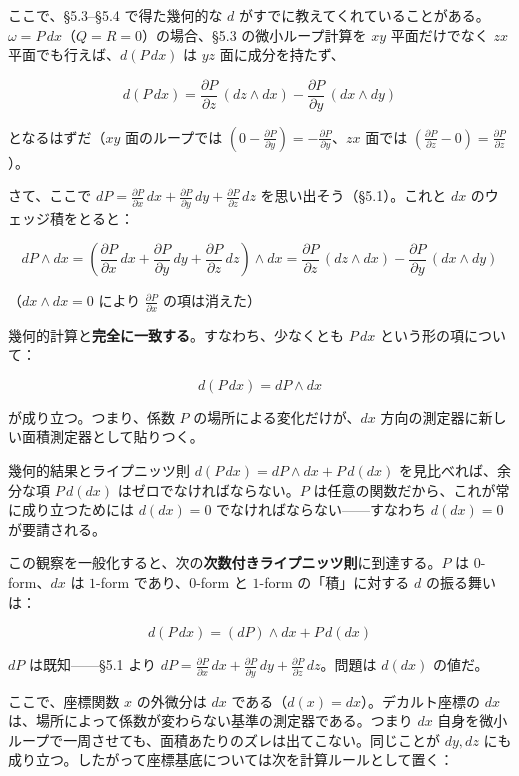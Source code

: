 \documentclass[a4paper,12pt,openany]{book}
\begin{document}
ここで、§5.3–§5.4 で得た幾何的な \(d\)
がすでに教えてくれていることがある。\(\omega = P\,dx\)（\(Q=R=0\)）の場合、§5.3
の微小ループ計算を \(xy\) 平面だけでなく \(zx\)
平面でも行えば、\(d(P\,dx)\) は \(yz\) 面に成分を持たず、

\[d(P\,dx) = \frac{\partial P}{\partial z}\,(dz \wedge dx) - \frac{\partial P}{\partial y}\,(dx \wedge dy)\]

となるはずだ（\(xy\) 面のループでは
\((0 - \frac{\partial P}{\partial y}) = -\frac{\partial P}{\partial y}\)、\(zx\)
面では
\((\frac{\partial P}{\partial z} - 0) = \frac{\partial P}{\partial z}\)）。

さて、ここで
\(dP = \frac{\partial P}{\partial x}\,dx + \frac{\partial P}{\partial y}\,dy + \frac{\partial P}{\partial z}\,dz\)
を思い出そう（§5.1）。これと \(dx\) のウェッジ積をとると：

\[dP \wedge dx = (\frac{\partial P}{\partial x}\,dx + \frac{\partial P}{\partial y}\,dy + \frac{\partial P}{\partial z}\,dz) \wedge dx = \frac{\partial P}{\partial z}\,(dz \wedge dx) - \frac{\partial P}{\partial y}\,(dx \wedge dy)\]

（\(dx \wedge dx = 0\) により \(\frac{\partial P}{\partial x}\)
の項は消えた）

幾何的計算と\textbf{完全に一致する}。すなわち、少なくとも \(P\,dx\)
という形の項について：

\[d(P\,dx) = dP \wedge dx\]

が成り立つ。つまり、係数 \(P\) の場所による変化だけが、\(dx\)
方向の測定器に新しい面積測定器として貼りつく。

幾何的結果とライプニッツ則 \(d(P\,dx) = dP \wedge dx + P\,d(dx)\)
を見比べれば、余分な項 \(P\,d(dx)\) はゼロでなければならない。\(P\)
は任意の関数だから、これが常に成り立つためには \(d(dx)=0\)
でなければならない——すなわち \(d(dx) = 0\) が要請される。

この観察を一般化すると、次の\textbf{次数付きライプニッツ則}に到達する。\(P\)
は \(0\)-form、\(dx\) は \(1\)-form であり、\(0\)-form と \(1\)-form
の「積」に対する \(d\) の振る舞いは：

\[d(P\,dx) = (dP) \wedge dx + P\,d(dx)\]

\(dP\) は既知——§5.1 より
\(dP = \frac{\partial P}{\partial x}\,dx + \frac{\partial P}{\partial y}\,dy + \frac{\partial P}{\partial z}\,dz\)。問題は
\(d(dx)\) の値だ。

ここで、座標関数 \(x\) の外微分は \(dx\)
である（\(d(x) = dx\)）。デカルト座標の \(dx\)
は、場所によって係数が変わらない基準の測定器である。つまり \(dx\)
自身を微小ループで一周させても、面積あたりのズレは出てこない。同じことが
\(dy,dz\)
にも成り立つ。したがって座標基底については次を計算ルールとして置く：
\end{document}
